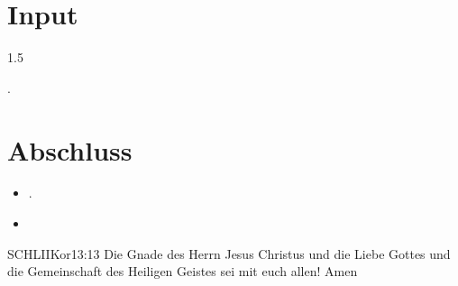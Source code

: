 \documentclass[fontsize=14pt]{../../inc/mybib}
\begin{document}
\section{Input}
\begin{spacing}{1.5}
   \begin{block}[2. Petrus]
    
    \end{block}    
    .
\end{spacing}
\section{Abschluss}
\begin{itemize}
    \item [] .
    \item [] 
\end{itemize}
\begin{bibelbox}{SCHL}{IIKor}{13:13}
    Die Gnade des Herrn Jesus Christus und die Liebe Gottes und die Gemeinschaft des Heiligen Geistes sei mit euch allen! Amen
\end{bibelbox}
\end{document}
